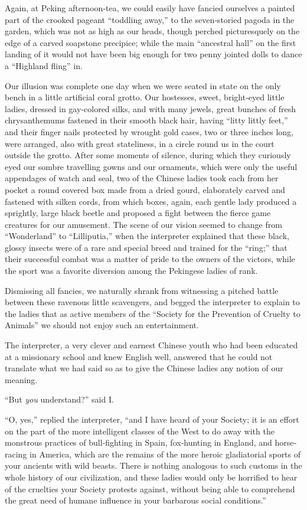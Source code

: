 \documentclass[12pt]{book}
\begin{document}
Again, at Peking afternoon‐tea, we could easily have fancied ourselves a
painted part of the crooked pageant “toddling away,” to the seven‐storied pagoda
in the garden, which was not as high as our heads, though perched picturesquely
on the edge of a carved soapstone precipice; while the main “ancestral hall” on
the first landing of it would not have been big enough for two penny jointed dolls
to dance a “Highland fling” in.

Our illusion was complete one day when we were seated in state on the only
bench in a little artificial coral grotto. Our hostesses, sweet, bright‐eyed little
ladies, dressed in gay‐colored silks, and with many jewels, great bunches of fresh
chrysanthemums fastened in their smooth black hair, having “litty littly feet,” and
their finger nails protected by wrought gold cases, two or three inches long, were
arranged, also with great stateliness, in a circle round us in the court outside
the grotto. After some moments of silence, during which they curiously eyed
our sombre travelling gowns and our ornaments, which were only the useful
appendages of watch and seal, two of the Chinese ladies took each from her pocket
a round covered box made from a dried gourd, elaborately carved and fastened
with silken cords, from which boxes, again, each gentle lady produced a sprightly,
large black beetle and proposed a fight between the fierce game creatures for our
amusement. The scene of our vision seemed to change from “Wonderland” to
“Lilliputia,” when the interpreter explained that these black, glossy insects were
of a rare and special breed and trained for the “ring;” that their successful combat
was a matter of pride to the owners of the victors, while the sport was a favorite
diversion among the Pekingese ladies of rank.

Dismissing all fancies, we naturally shrank from witnessing a pitched battle
between these ravenous little scavengers, and begged the interpreter to explain
to the ladies that as active members of the “Society for the Prevention of Cruelty
to Animals” we should not enjoy such an entertainment.

The interpreter, a very clever and earnest Chinese youth who had been educated at a missionary school and knew English well, answered that he could
not translate what we had said so as to give the Chinese ladies any notion of our
meaning.

“But \emph{you} understand?” said I.

“O, yes,” replied the interpreter, “and I have heard of your Society; it is an
effort on the part of the more intelligent classes of the West to do away with
the monstrous practices of bull‐fighting in Spain, fox‐hunting in England, and
horse‐racing in America, which are the remains of the more heroic gladiatorial
sports of your ancients with wild beasts. There is nothing analogous to such
customs in the whole history of our civilization, and these ladies would only be
horrified to hear of the cruelties your Society protests against, without being
able to comprehend the great need of humane influence in your barbarous social
conditions.”
\end{document}
